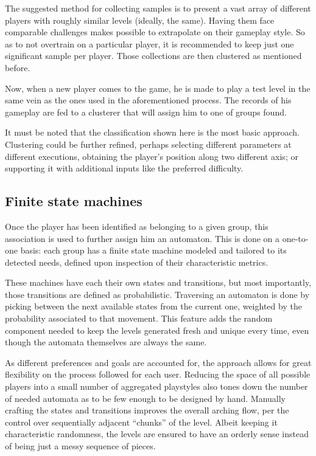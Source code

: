 \documentclass[conference]{IEEEtran}
\begin{document}
The suggested method for collecting samples is to present a vast array of different players with roughly similar levels (ideally, the same). Having them face comparable challenges makes possible to extrapolate on their gameplay style. So as to not overtrain on a particular player, it is recommended to keep just one significant sample per player. Those collections are then clustered as mentioned before.

Now, when a new player comes to the game, he is made to play a test level in the same vein as the ones used in the aforementioned process. The records of his gameplay are fed to a clusterer that will assign him to one of groups found.

It must be noted that the classification shown here is the most basic approach. Clustering could be further refined, perhaps selecting different parameters at different executions, obtaining the player's position along two different axis; or supporting it with additional inputs like the preferred difficulty.

\subsection{Finite state machines}

Once the player has been identified as belonging to a given group, this association is used to further assign him an automaton. This is done on a one-to-one basis: each group has a finite state machine modeled and tailored to its detected needs, defined upon inspection of their characteristic metrics.

These machines have each their own states and transitions, but most importantly, those transitions are defined as probabilistic. Traversing an automaton is done by picking between the next available states from the current one, weighted by the probability associated to that movement. This feature adds the random component needed to keep the levels generated fresh and unique every time, even though the automata themselves are always the same.

As different preferences and goals are accounted for, the approach allows for great flexibility on the process followed for each user. Reducing the space of all possible players into a small number of aggregated playstyles also tones down the number of needed automata as to be few enough to be designed by hand. Manually crafting the states and transitions improves the overall arching flow, per the control over sequentially adjacent ``chunks'' of the level. Albeit keeping it characteristic randomness, the levels are ensured to have an orderly sense instead of being just a messy sequence of pieces.
\end{document}
